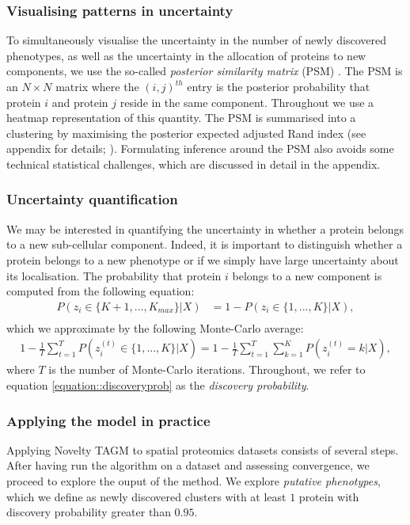 \documentclass[12pt,english]{article}
\begin{document}
\subsubsection*{Visualising patterns in uncertainty}
To simultaneously visualise the uncertainty in the number of newly discovered phenotypes, as well as the uncertainty in the allocation of proteins to new components, we use the so-called \textit{posterior similarity matrix} (PSM) \citep{fritsch::2009}. The PSM is an $N\times N$ matrix where the $(i,j)^{th}$ entry is the posterior probability that protein $i$ and protein $j$ reside in the same component. Throughout we use a heatmap representation of this quantity. The PSM is summarised into a clustering by maximising the posterior expected adjusted Rand index (see appendix for details; \citep{fritsch::2009}). Formulating inference around the PSM also avoids some technical statistical challenges, which are discussed in detail in the appendix.
\subsubsection*{Uncertainty quantification}
We may be interested in quantifying the uncertainty in whether a protein belongs to a new sub-cellular component. Indeed, it is important to distinguish whether a protein belongs to a new phenotype or if we simply have large uncertainty about its localisation. The probability that protein $i$ belongs to a new component is computed from the following equation:
\begin{align}
P(z_i \in \{K + 1,..., K_{max}\}|X) & = 1 - P(z_i \in \{1,..., K\}|X), \\ 
\end{align}
which we approximate by the following Monte-Carlo average:
\begin{align}\label{equation::discoveryprob}
1 - \frac{1}{T} \sum_{t = 1}^{T}P(z^{(t)}_i \in \{1,..., K\}|X)= 1 - \frac{1}{T} \sum_{t = 1}^{T} \sum_{k=1}^KP(z^{(t)}_i = k|X),
\end{align}
where $T$ is the number of Monte-Carlo iterations. Throughout, we refer to equation \ref{equation::discoveryprob} as the \textit{discovery probability}.
\subsubsection*{Applying the model in practice}
Applying Novelty TAGM to spatial proteomics datasets consists of several steps. After having run the algorithm on a dataset and assessing convergence, we proceed to explore the ouput of the method. We explore \textit{putative phenotypes}, which we define as newly discovered clusters with at least $1$ protein with discovery probability greater than $0.95$.
\end{document}
